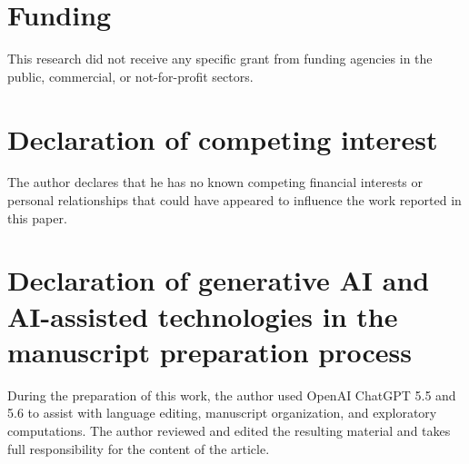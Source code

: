 \documentclass[11pt]{article}
\theoremstyle{definition}
\theoremstyle{remark}
\begin{document}
\section*{Funding}

This research did not receive any specific grant from funding agencies in the
public, commercial, or not-for-profit sectors.

\section*{Declaration of competing interest}

The author declares that he has no known competing financial interests or
personal relationships that could have appeared to influence the work
reported in this paper.

\section*{Declaration of generative AI and AI-assisted technologies in the
manuscript preparation process}

During the preparation of this work, the author used OpenAI ChatGPT 5.5 and 5.6 to assist with language editing, manuscript organization, and exploratory computations. The author reviewed and edited the resulting material and takes full responsibility for the content of the article.
\end{document}
